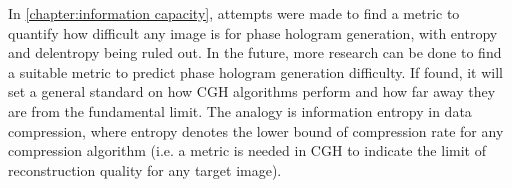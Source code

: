 In \cref{chapter:information capacity}, attempts were made to find a metric to quantify how difficult any image is for phase hologram generation, with entropy and delentropy being ruled out. In the future, more research can be done to find a suitable metric to predict phase hologram generation difficulty. If found, it will set a general standard on how CGH algorithms perform and how far away they are from the fundamental limit. The analogy is information entropy in data compression, where entropy denotes the lower bound of compression rate for any compression algorithm (i.e. a metric is needed in CGH to indicate the limit of reconstruction quality for any target image).